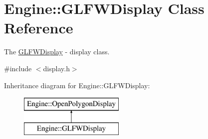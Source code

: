 \hypertarget{classEngine_1_1GLFWDisplay}{}\section{Engine\+:\+:G\+L\+F\+W\+Display Class Reference}
\label{classEngine_1_1GLFWDisplay}


The \hyperlink{classEngine_1_1GLFWDisplay}{G\+L\+F\+W\+Display} -\/ display class.  




{\ttfamily \#include $<$display.\+h$>$}

Inheritance diagram for Engine\+:\+:G\+L\+F\+W\+Display\+:\begin{figure}[H]
\begin{center}
\leavevmode
\includegraphics[height=2.000000cm]{classEngine_1_1GLFWDisplay}
\end{center}
\end{figure}
